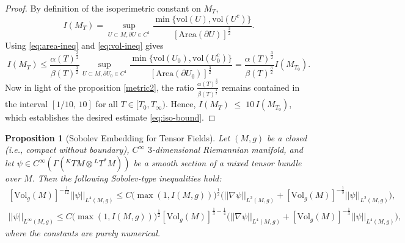 \documentclass{amsart}
\newtheorem{proposition}{Proposition}[section]
\begin{document}
\begin{proof}
\medskip
\noindent By definition of the isoperimetric constant on $M_{T}$,
\[
   I(M_{T})
   =\sup_{U\subset M,\partial U\in C^{1}}\frac{\min\{\text{vol}(U),\text{vol}(U^{c})\}}{[\text{Area}(\partial U)]^{\frac{3}{2}}}.
\]
Using \eqref{eq:area-ineq} and \eqref{eq:vol-ineq} gives
\[
   I(M_{T})
   \leq \frac{\alpha(T)^{\frac{3}{2}}}{\beta(T)^{\frac{3}{2}}}\sup_{U\subset M,\partial U_{0}\in C^{1}}\frac{\min\{\text{vol}(U_{0}),\text{vol}(U^{c}_{0})\}}{[\text{Area}(\partial U_{0})]^{\frac{3}{2}}}=\frac{\alpha(T)^{\frac{3}{2}}}{\beta(T)^{\frac{3}{2}}}I(M_{T_{0}}).
\]
\medskip
Now in light of the proposition \ref{metric2}, the ratio $
      \frac{\alpha(T)^{\frac{3}{2}}}{\beta(T)^{\frac{3}{2}}}$
remains contained in the interval \([1/10,\, 10]\) for all 
$T\in[T_{0},T_{\infty})$.  
Hence, $I(M_{T})\;\leq\;10\,I(M_{T_{0}})$,
which establishes the desired estimate \eqref{eq:iso-bound}.
\end{proof}

  

\begin{proposition}[Sobolev Embedding for Tensor Fields]
\label{sobolev}
Let $(M,g)$ be a closed (i.e., compact without boundary), $C^{\infty}$ $3$-dimensional Riemannian manifold, and let $\psi \in C^{\infty}(\Gamma({}^{K}TM \otimes {}^{L}T^{*}M))$ be a smooth section of a mixed tensor bundle over $M$. Then the following Sobolev-type inequalities hold:
\begin{align}
\label{eq:sobolev-L4}
[\text{Vol}_{g}(M)]^{-\frac{1}{12}}||\psi||_{L^{4}(M,g)}\leq C\bigg(\max(1,I(M,g))\bigg)^{\frac{1}{2}}\bigg(||\nabla\psi||_{L^{2}(M,g)}+[\text{Vol}_{g}(M)]^{-\frac{1}{3}}||\psi||_{L^{2}(M,g)}\bigg),\\
\label{eq:sobolevL4}
 ||\psi||_{L^{\infty}(M,g)}\leq C\bigg(\max(1,I(M,g))\bigg)^{\frac{1}{2}}[\text{Vol}_{g}(M)]^{\frac{1}{3}-\frac{1}{4}}\bigg(||\nabla\psi||_{L^{4}(M,g)}+[\text{Vol}_{g}(M)]^{-\frac{1}{3}}||\psi||_{L^{4}(M,g)}\bigg),   
\end{align}
where the constants are purely numerical.
\end{proposition}
\end{document}
